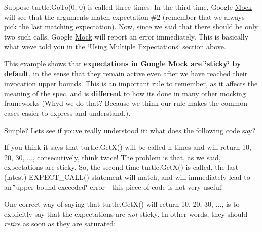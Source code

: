 Suppose {\ttfamily turtle.\+Go\+To(0, 0)} is called three times. In the third time, Google \mbox{\hyperlink{class_mock}{Mock}} will see that the arguments match expectation \#2 (remember that we always pick the last matching expectation). Now, since we said that there should be only two such calls, Google \mbox{\hyperlink{class_mock}{Mock}} will report an error immediately. This is basically what we\textquotesingle{}ve told you in the \char`\"{}\+Using Multiple Expectations\char`\"{} section above.

This example shows that {\bfseries{expectations in Google \mbox{\hyperlink{class_mock}{Mock}} are \char`\"{}sticky\char`\"{} by default}}, in the sense that they remain active even after we have reached their invocation upper bounds. This is an important rule to remember, as it affects the meaning of the spec, and is {\bfseries{different}} to how it\textquotesingle{}s done in many other mocking frameworks (Why\textquotesingle{}d we do that? Because we think our rule makes the common cases easier to express and understand.).

Simple? Let\textquotesingle{}s see if you\textquotesingle{}ve really understood it\+: what does the following code say?


\begin{DoxyCode}{0}
\DoxyCodeLine{\}}
\end{DoxyCode}


If you think it says that {\ttfamily turtle.\+Get\+X()} will be called {\ttfamily n} times and will return 10, 20, 30, ..., consecutively, think twice! The problem is that, as we said, expectations are sticky. So, the second time {\ttfamily turtle.\+Get\+X()} is called, the last (latest) {\ttfamily E\+X\+P\+E\+C\+T\+\_\+\+C\+A\+L\+L()} statement will match, and will immediately lead to an \char`\"{}upper bound exceeded\char`\"{} error -\/ this piece of code is not very useful!

One correct way of saying that {\ttfamily turtle.\+Get\+X()} will return 10, 20, 30, ..., is to explicitly say that the expectations are {\itshape not} sticky. In other words, they should {\itshape retire} as soon as they are saturated\+:


\begin{DoxyCode}{0}
\DoxyCodeLine{\}}
\end{DoxyCode}



